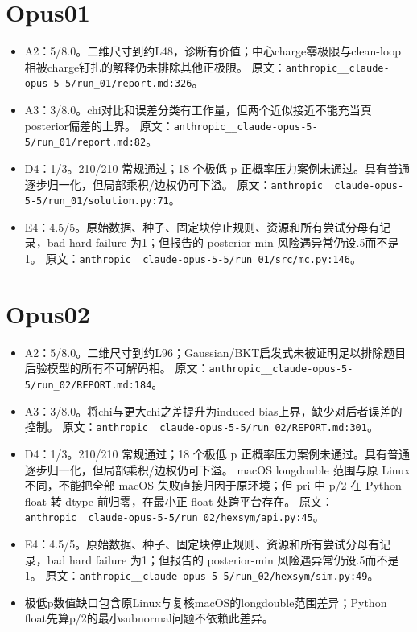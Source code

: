 \documentclass[11pt,a4paper]{article}
\begin{document}
\section*{Opus01}

\begin{itemize}
\item A2：5/8.0。二维尺寸到约L48，诊断有价值；中心charge零极限与clean-loop相被charge钉扎的解释仍未排除其他正极限。 原文：\nolinkurl{anthropic__claude-opus-5-5/run_01/report.md:326}。
\item A3：3/8.0。chi对比和误差分类有工作量，但两个近似接近不能充当真posterior偏差的上界。 原文：\nolinkurl{anthropic__claude-opus-5-5/run_01/report.md:82}。
\item D4：1/3。210/210 常规通过；18 个极低 p 正概率压力案例未通过。具有普通逐步归一化，但局部乘积/边权仍可下溢。 原文：\nolinkurl{anthropic__claude-opus-5-5/run_01/solution.py:71}。
\item E4：4.5/5。原始数据、种子、固定块停止规则、资源和所有尝试分母有记录，bad hard failure 为1；但报告的 posterior-min 风险遇异常仍设.5而不是1。 原文：\nolinkurl{anthropic__claude-opus-5-5/run_01/src/mc.py:146}。
\end{itemize}

\section*{Opus02}

\begin{itemize}
\item A2：5/8.0。二维尺寸到约L96；Gaussian/BKT启发式未被证明足以排除题目后验模型的所有不可解码相。 原文：\nolinkurl{anthropic__claude-opus-5-5/run_02/REPORT.md:184}。
\item A3：3/8.0。将chi与更大chi之差提升为induced bias上界，缺少对后者误差的控制。 原文：\nolinkurl{anthropic__claude-opus-5-5/run_02/REPORT.md:301}。
\item D4：1/3。210/210 常规通过；18 个极低 p 正概率压力案例未通过。具有普通逐步归一化，但局部乘积/边权仍可下溢。 macOS longdouble 范围与原 Linux 不同，不能把全部 macOS 失败直接归因于原环境；但 pri 中 p/2 在 Python float 转 dtype 前归零，在最小正 float 处跨平台存在。 原文：\nolinkurl{anthropic__claude-opus-5-5/run_02/hexsym/api.py:45}。
\item E4：4.5/5。原始数据、种子、固定块停止规则、资源和所有尝试分母有记录，bad hard failure 为1；但报告的 posterior-min 风险遇异常仍设.5而不是1。 原文：\nolinkurl{anthropic__claude-opus-5-5/run_02/hexsym/sim.py:49}。
\item 极低p数值缺口包含原Linux与复核macOS的longdouble范围差异；Python float先算p/2的最小subnormal问题不依赖此差异。
\end{itemize}
\end{document}

